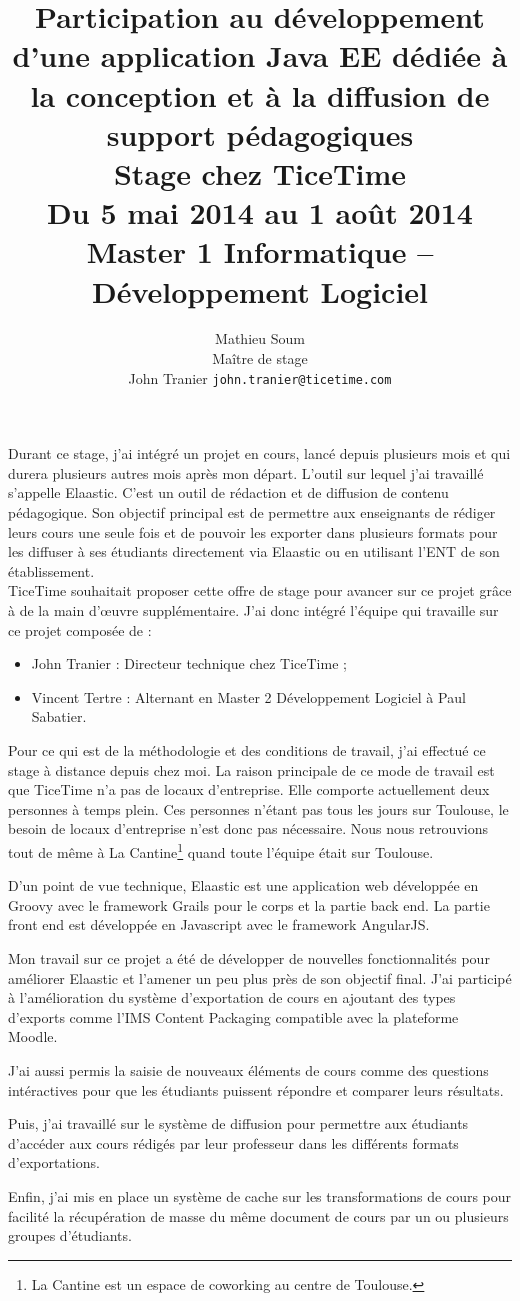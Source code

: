 \documentclass[a4paper, 11pt]{article}
\title{
  Participation au développement d'une application Java EE dédiée à la
  conception et à la diffusion de support pédagogiques\\
  \vspace{10px}
  {
	\large Stage chez TiceTime\\
	Du 5 mai 2014 au 1 août 2014\\
	Master 1 Informatique -- Développement Logiciel
  }
}
\author{
  Mathieu {\sc Soum}
  \vspace{10px}\\
  Maître de stage\\
	John {\sc Tranier} {\tt john.tranier@ticetime.com}
}
\date{}
\begin{document}
\maketitle

Durant ce stage, j'ai intégré un projet en cours, lancé depuis plusieurs mois et
qui durera plusieurs autres mois après mon départ. L'outil sur lequel j'ai
travaillé s'appelle Elaastic. C'est un outil de rédaction et de diffusion de
contenu pédagogique. Son objectif principal est de permettre aux enseignants de
rédiger leurs cours une seule fois et de pouvoir les exporter dans plusieurs
formats pour les diffuser à ses étudiants directement via Elaastic ou en
utilisant l'ENT de son établissement.\\

TiceTime souhaitait proposer cette offre de stage pour avancer sur ce projet
grâce à de la main d'\oe uvre supplémentaire.
J'ai donc intégré l'équipe qui travaille sur ce projet composée de :
\begin{itemize}
  \item John {\sc Tranier} : Directeur technique chez TiceTime ;
  \item Vincent {\sc Tertre} : Alternant en Master 2 Développement Logiciel à
	Paul Sabatier.
\end{itemize}
\vspace{10px}

Pour ce qui est de la méthodologie et des conditions de travail, j'ai effectué
ce stage à distance depuis chez moi. La raison principale de ce mode de travail
est que TiceTime n'a pas de locaux d'entreprise. Elle comporte
actuellement deux personnes à temps plein. Ces personnes n'étant pas tous les
jours sur Toulouse, le besoin de locaux d'entreprise n'est donc pas nécessaire. Nous nous
retrouvions tout de même à La Cantine\footnote{La Cantine est un espace de
coworking au centre de Toulouse.} quand toute l'équipe était sur Toulouse.

D'un point de vue technique, Elaastic est une application web développée en
Groovy avec le framework Grails pour le corps et la partie back end. La partie
front end est développée en Javascript avec le framework AngularJS.

Mon travail sur ce projet a été de développer de nouvelles fonctionnalités pour
améliorer Elaastic et l'amener un peu plus près de son objectif final. J'ai
participé à l'amélioration du système d'exportation de cours en ajoutant des
types d'exports comme l'IMS Content Packaging compatible avec la plateforme
Moodle.

J'ai aussi permis la saisie de nouveaux éléments de cours comme des
questions intéractives pour que les étudiants puissent répondre et comparer
leurs résultats.

Puis, j'ai travaillé sur le système de diffusion pour
permettre aux étudiants d'accéder aux cours rédigés par leur professeur dans les
différents formats d'exportations.

Enfin, j'ai mis en place un système de cache
sur les transformations de cours pour facilité la récupération de masse du même
document de cours par un ou plusieurs groupes d'étudiants.
\end{document}
